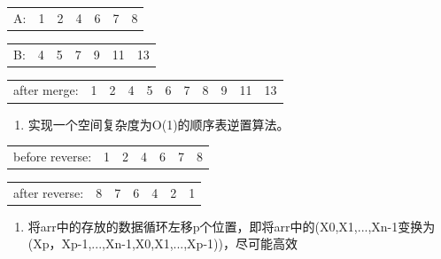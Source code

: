 \documentclass[lang=cn,newtx,10pt,scheme=chinese]{../../elegantbook}
\begin{document}
\begin{table}[!htbp]
\centering
\begin{tabular}{c|c|c|c|c|c|c|}
\cline{2-7}
A: & 1 & 2 & 4 & 6 & 7 & 8 \\
\cline{2-7}
\end{tabular}
\end{table}



\begin{table}[!htbp]
\centering
\begin{tabular}{c|c|c|c|c|c|c|}
\cline{2-7}
B: & 4 & 5 & 7 & 9 & 11 & 13 \\
\cline{2-7}
\end{tabular}
\end{table}

\begin{table}[!htbp]
\centering
\begin{tabular}{c|c|c|c|c|c|c|c|c|c|c|}
\cline{2-11}
after merge: & 1 & 2 & 4 & 5 & 6 & 7 & 8 & 9 & 11 & 13 \\
\cline{2-11}
\end{tabular}
\end{table}

\begin{enumerate}
\def\labelenumi{\arabic{enumi}.}
\setcounter{enumi}{7}
\vspace{5cm}
\item
  
  实现一个空间复杂度为O(1)的顺序表逆置算法。
  
\end{enumerate}

\begin{table}[!htbp]
\centering
\begin{tabular}{c|c|c|c|c|c|c|}
\cline{2-7}
before reverse: & 1 & 2 & 4 & 6 & 7 & 8 \\
\cline{2-7}
\end{tabular}
\end{table}

\begin{table}[!htbp]
\centering
\begin{tabular}{c|c|c|c|c|c|c|}
\cline{2-7}
after reverse: & 8 & 7 & 6 & 4 & 2 & 1 \\
\cline{2-7}
\end{tabular}
\end{table}

\begin{enumerate}
\def\labelenumi{\arabic{enumi}.}
\setcounter{enumi}{8}
\vspace{5cm}
\item
  
  将arr中的存放的数据循环左移p个位置，即将arr中的(X0,X1,...,Xn-1变换为(Xp，Xp-1,...,Xn-1,X0,X1,...,Xp-1))，尽可能高效
  
\end{enumerate}
\end{document}
